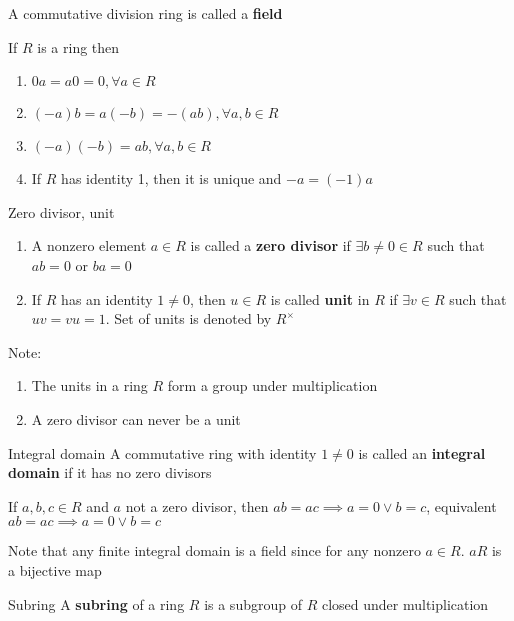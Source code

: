\documentclass[titlepage, 12pt]{article}
\begin{document}
A commutative division ring is called a \textbf{field}

\begin{proposition}{}{}
    If $R$ is a ring then
    \begin{enumerate}
        \item $0a=a0=0, \forall a\in R$
        \item $(-a)b=a(-b)=-(ab), \forall a,b\in R$
        \item $(-a)(-b) = ab,\forall a,b\in R$
        \item If $R$ has identity 1, then it is unique and $-a = (-1)a$
    \end{enumerate}
\end{proposition}

\begin{definition}{Zero divisor, unit}{}
    \begin{enumerate}
        \item A nonzero element $a\in R$ is called a \textbf{zero divisor} if
        $\exists b\neq 0\in R$ such that $ab=0$ or $ba=0$
        \item If $R$ has an identity $1\neq 0$, then $u\in R$ is called
        \textbf{unit} in $R$ if $\exists v\in R$ such that $uv=vu=1$. Set of
        units is denoted by $R^\times$
    \end{enumerate}
\end{definition}
 Note:
\begin{enumerate}
    \item The units in a ring $R$ form a group under multiplication
    \item A zero divisor can never be a unit
\end{enumerate}

\begin{definition}{Integral domain}{}
    A commutative ring with identity $1\neq 0$ is called an \textbf{integral
    domain} if it has no zero divisors
\end{definition}

\begin{proposition}{}{}
    If $a,b,c\in R$ and $a$ not a zero divisor, then $ab=ac\implies a = 0 \lor b =
    c$, equivalent $ab=ac\implies a = 0\lor b = c$
\end{proposition}

Note that any finite integral domain is a field since for any nonzero $a\in R$.
$aR$ is a bijective map

\begin{definition}{Subring}{}
    A \textbf{subring} of a ring $R$ is a subgroup of $R$ closed under
    multiplication
\end{definition}
\end{document}
